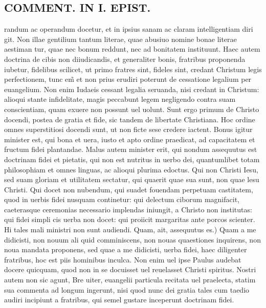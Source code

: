 \documentclass{article}
\begin{document}
\begin{pages}
\section*{COMMENT. IN I. EPIST. }
\marginpar{[ p.508 ]}\pstart randum ac operandum docetur, et in ipsius sanam ac claram intelligentiam diri git. Non illae gentilium tantum literae, quae abusiuo nomine bonae literae aestiman tur, quae nec bonum reddunt, nec ad bonitatem instituunt. Haec autem doctrina de cibis non diiudicandis, et generaliter bonis, fratribus proponenda iubetur, fidelibus scilicet, ut primo fratres sint, fideles sint, credant Christum legis perfectionem, tunc em̃ et non prius erudiri poterunt de cessatione legalium per euangelium. Non enim Iudaeis cessant legalia seruanda, nisi credant in Christum: alioqui stante infidelitate, magis peccabunt legem negligendo contra suam conscientiam, quam exuere non possunt uel uolunt. Sunt ergo primum de Christo docendi, postea de gratia et fide, sic tandem de libertate Christiana. Hoc ordine omnes superstitiosi docendi sunt, ut non ficte sese credere iactent. Bonus igitur minister est, qui bona et uera, iusto et apto ordine praedicat, ad capacitatem et fructum fidei plantandae. Malus autem minister erit, qui nondum assequutus est doctrinam fidei et pietatis, qui non est nutritus in uerbo dei, quantumlibet totam philosophiam et omnes linguas, ac alioqui plurima edoctus. Qui non Christi Iesu, sed suam gloriam et utilitatem sectatur, qui quaerit quae sua sunt, non quae lesu Christi. Qui docet non nubendum, qui suadet fouendam perpetuam castitatem, quod in uerbis fidei nusquam continetur: qui delectum ciborum magnifacit, caeterasque ceremonias necessario implendas iniungit, a Christo non institutas: qui fidei simpli cis uerba non docet: qui proiicit margaritas ante porcos scienter. Hi tales mali ministri non sunt audiendi. Quam, ait, assequutus es.) Quam a me didicisti, non nouum ali quid comminiscens, non nouas quaestiones inquirens, non noua mandata proponens, sed quae a me didicisti, uerba fidei, haec diligenter fratribus, hoc est piis hominibus inculca. Non enim uel ipse Paulus audebat docere quicquam, quod non in se docuisset uel reuelasset Christi spiritus. Nostri autem non sic agunt, Bre uiter, euangelii particula recitata uel praelecta, statim sua commenta ad longum ingerunt, nisi quod nunc dei gratia tales cum taedio audiri incipiunt a fratribus, qui semel gustare inceperunt doctrinam fidei.  \pend
{}
{}

\end{pages}
\end{document}
